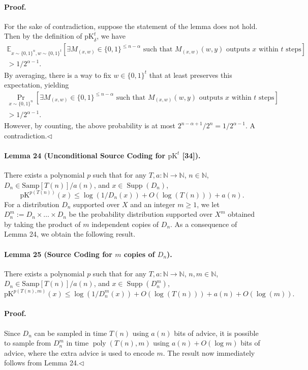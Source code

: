 \documentclass[10pt,a4paper]{article}
\begin{document}
\paragraph{Proof.} For the sake of contradiction, suppose the statement of the lemma does not hold. Then by the definition of $\mathrm{pK}_\delta^t$, we have
\begin{multline*}
\mathbb E_{x\sim\{0,1\}^n,w\sim\{0,1\}^t}[\exists M_{(x,w)}\in\{0,1\}^{\leq n-\alpha}\text{ such that }M_{(x,w)}(w,y)\text{ outputs }x\text{ within }t\text{ steps}]\\
>1/2^{\alpha-1}.
\end{multline*}
By averaging, there is a way to fix $w\in\{0,1\}^t$ that at least preserves this expectation, yielding
\begin{multline*}
\Pr_{x\sim\{0,1\}^n}[\exists M_{(x,w)}\in\{0,1\}^{\leq n-\alpha}\text{ such that }M_{(x,w)}(w,y)\text{ outputs }x\text{ within }t\text{ steps}]\\
>1/2^{\alpha-1}.
\end{multline*}
However, by counting, the above probability is at most $2^{n-\alpha+1}/2^n=1/2^{\alpha-1}$. A contradiction.\hfill$\triangleleft$
\paragraph{Lemma 24 (Unconditional Source Coding for $\mathrm{pK}^t$ [34]).} There exists a polynomial $p$ such that for any $T,a:\mathbb N\to\mathbb N$, $n\in\mathbb N$, $D_n\in\mathrm{Samp}[T(n)]/a(n)$, and $x\in\operatorname{Supp}(D_n)$,
\[\mathrm{pK}^{p(T(n))}(x)\leq\log(1/D_n(x))+O(\log(T(n)))+a(n).\]
For a distribution $D_n$ supported over $X$ and an integer $m\geq1$, we let $D_n^m:=D_n\times\ldots\times D_n$ be the probability distribution supported over $X^m$ obtained by taking the product of $m$ independent copies of $D_n$.
As a consequence of Lemma 24, we obtain the following result.
\paragraph{Lemma 25 (Source Coding for $m$ copies of $D_n$).} There exists a polynomial $p$ such that for any $T,a:\mathbb N\to\mathbb N$, $n,m\in\mathbb N$, $D_n\in\mathrm{Samp}[T(n)]/a(n)$, and $x\in\operatorname{Supp}(D_n^m)$,
\[\mathrm{pK}^{p(T(n),m)}(x)\leq\log(1/D_n^m(x))+O(\log(T(n)))+a(n)+O(\log(m)).\]
\paragraph{Proof.} Since $D_n$ can be sampled in time $T(n)$ using $a(n)$ bits of advice, it is possible to sample from $D_n^m$ in time $\operatorname{poly}(T(n),m)$ using $a(n)+O(\log m)$ bits of advice, where the extra advice is used to encode $m$. The result now immediately follows from Lemma 24.\hfill$\triangleleft$
\end{document}
